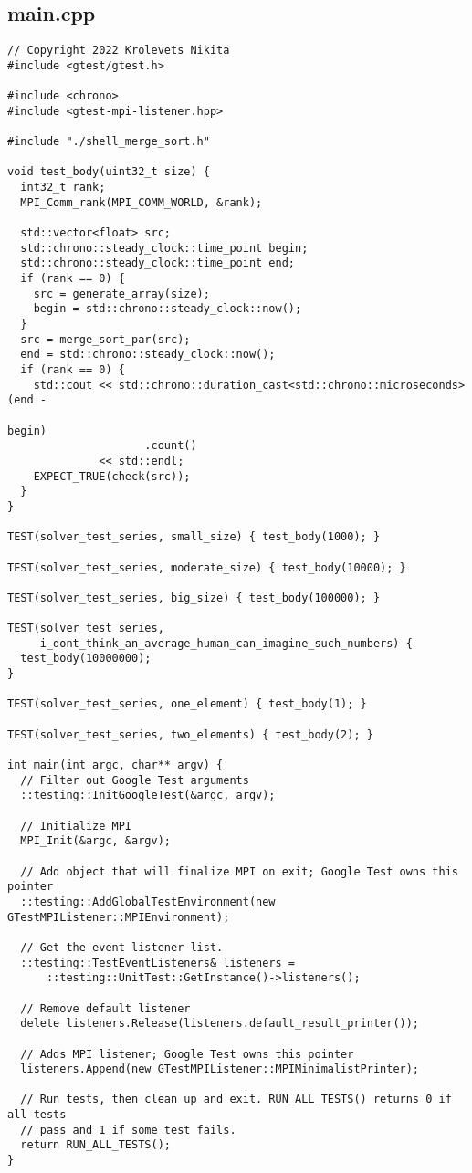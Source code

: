 \documentclass[14pt, a4paper]{extarticle}
\begin{document}
	\subsection{main.cpp}
	\begin{lstlisting}
// Copyright 2022 Krolevets Nikita
#include <gtest/gtest.h>

#include <chrono>
#include <gtest-mpi-listener.hpp>

#include "./shell_merge_sort.h"

void test_body(uint32_t size) {
  int32_t rank;
  MPI_Comm_rank(MPI_COMM_WORLD, &rank);

  std::vector<float> src;
  std::chrono::steady_clock::time_point begin;
  std::chrono::steady_clock::time_point end;
  if (rank == 0) {
    src = generate_array(size);
    begin = std::chrono::steady_clock::now();
  }
  src = merge_sort_par(src);
  end = std::chrono::steady_clock::now();
  if (rank == 0) {
    std::cout << std::chrono::duration_cast<std::chrono::microseconds>(end -
                                                                       begin)
                     .count()
              << std::endl;
    EXPECT_TRUE(check(src));
  }
}

TEST(solver_test_series, small_size) { test_body(1000); }

TEST(solver_test_series, moderate_size) { test_body(10000); }

TEST(solver_test_series, big_size) { test_body(100000); }

TEST(solver_test_series,
     i_dont_think_an_average_human_can_imagine_such_numbers) {
  test_body(10000000);
}

TEST(solver_test_series, one_element) { test_body(1); }

TEST(solver_test_series, two_elements) { test_body(2); }

int main(int argc, char** argv) {
  // Filter out Google Test arguments
  ::testing::InitGoogleTest(&argc, argv);

  // Initialize MPI
  MPI_Init(&argc, &argv);

  // Add object that will finalize MPI on exit; Google Test owns this pointer
  ::testing::AddGlobalTestEnvironment(new GTestMPIListener::MPIEnvironment);

  // Get the event listener list.
  ::testing::TestEventListeners& listeners =
      ::testing::UnitTest::GetInstance()->listeners();

  // Remove default listener
  delete listeners.Release(listeners.default_result_printer());

  // Adds MPI listener; Google Test owns this pointer
  listeners.Append(new GTestMPIListener::MPIMinimalistPrinter);

  // Run tests, then clean up and exit. RUN_ALL_TESTS() returns 0 if all tests
  // pass and 1 if some test fails.
  return RUN_ALL_TESTS();
}

	\end{lstlisting}
	\newpage
\end{document}
